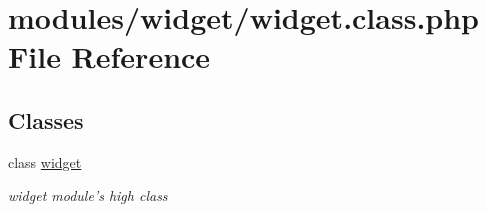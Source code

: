\hypertarget{widget_8class_8php}{\section{modules/widget/widget.class.\+php File Reference}
\label{widget_8class_8php}
}
\subsection*{Classes}
\begin{DoxyCompactItemize}
\item 
class \hyperlink{classwidget}{widget}
\begin{DoxyCompactList}\small\item\em widget module's high class \end{DoxyCompactList}\end{DoxyCompactItemize}
